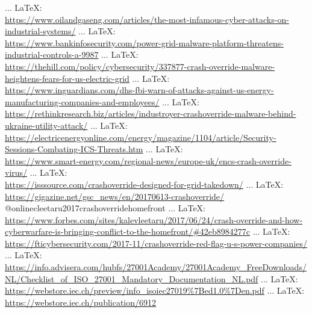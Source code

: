 \begin{thebibliography}{99}
{{{			 ... \LaTeX:\\ \url{https://www.oilandgaseng.com/articles/the-most-infamous-cyber-attacks-on-industrial-systems/}
			 ... \LaTeX:\\ \url{https://www.bankinfosecurity.com/power-grid-malware-platform-threatens-industrial-controls-a-9987}
			 ... \LaTeX:\\ \url{https://thehill.com/policy/cybersecurity/337877-crash-override-malware-heightens-fears-for-us-electric-grid}
			 ... \LaTeX:\\ \url{https://www.inguardians.com/dhs-fbi-warn-of-attacks-against-us-energy-manufacturing-companies-and-employees/}
			 ... \LaTeX:\\ \url{https://rethinkresearch.biz/articles/industroyer-crashoverride-malware-behind-ukraine-utility-attack/}
			 ... \LaTeX:\\ \url{https://electricenergyonline.com/energy/magazine/1104/article/Security-Sessions-Combating-ICS-Threats.htm}
			 ... \LaTeX:\\ \url{https://www.smart-energy.com/regional-news/europe-uk/encs-crash-override-virus/}
			 ... \LaTeX:\\ \url{https://isssource.com/crashoverride-designed-for-grid-takedown/}
			 ... \LaTeX:\\ \url{https://gigazine.net/gsc_news/en/20170613-crashoverride/}
			@onlinec{leetaru2017crashoverridehomefront} ... \LaTeX:\\ \url{https://www.forbes.com/sites/kalevleetaru/2017/06/24/crash-override-and-how-cyberwarfare-is-bringing-conflict-to-the-homefront/#42eb8984277c}
			 ... \LaTeX:\\ \url{https://fticybersecurity.com/2017-11/crashoverride-red-flag-u-s-power-companies/}
			 ... \LaTeX:\\ \url{https://info.advisera.com/hubfs/27001Academy/27001Academy_FreeDownloads/NL/Checklist_of_ISO_27001_Mandatory_Documentation_NL.pdf}
			 ... \LaTeX:\\ \url{https://webstore.iec.ch/preview/info_isoiec27019%7Bed1.0%7Den.pdf}
			 ... \LaTeX:\\ \url{https://webstore.iec.ch/publication/6912}
}}}
\end{thebibliography}
